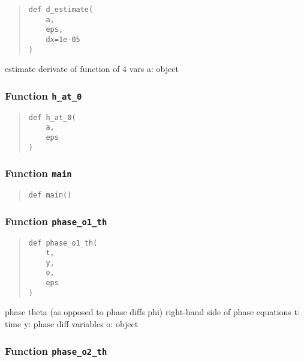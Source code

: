 \documentclass[english,a4paper,oneside]{article}
\begin{document}
\begin{quote}
\begin{verbatim}
def d_estimate(
    a,
    eps,
    dx=1e-05
)
\end{verbatim}
\end{quote}

estimate derivate of function of 4 vars a: object

\hypertarget{CGL.h_at_0}{%
\subsubsection{\texorpdfstring{Function
\texttt{h\_at\_0}}{Function h\_at\_0}}\label{CGL.h_at_0}}

\begin{quote}
\begin{verbatim}
def h_at_0(
    a,
    eps
)
\end{verbatim}
\end{quote}

\hypertarget{CGL.main}{%
\subsubsection{\texorpdfstring{Function
\texttt{main}}{Function main}}\label{CGL.main}}

\begin{quote}
\begin{verbatim}
def main()
\end{verbatim}
\end{quote}

\hypertarget{CGL.phase_o1_th}{%
\subsubsection{\texorpdfstring{Function
\texttt{phase\_o1\_th}}{Function phase\_o1\_th}}\label{CGL.phase_o1_th}}

\begin{quote}
\begin{verbatim}
def phase_o1_th(
    t,
    y,
    o,
    eps
)
\end{verbatim}
\end{quote}

phase theta (as opposed to phase diffs phi) right-hand side of phase
equations t: time y: phase diff variables o: object

\hypertarget{CGL.phase_o2_th}{%
\subsubsection{\texorpdfstring{Function
\texttt{phase\_o2\_th}}{Function phase\_o2\_th}}\label{CGL.phase_o2_th}}
\end{document}

